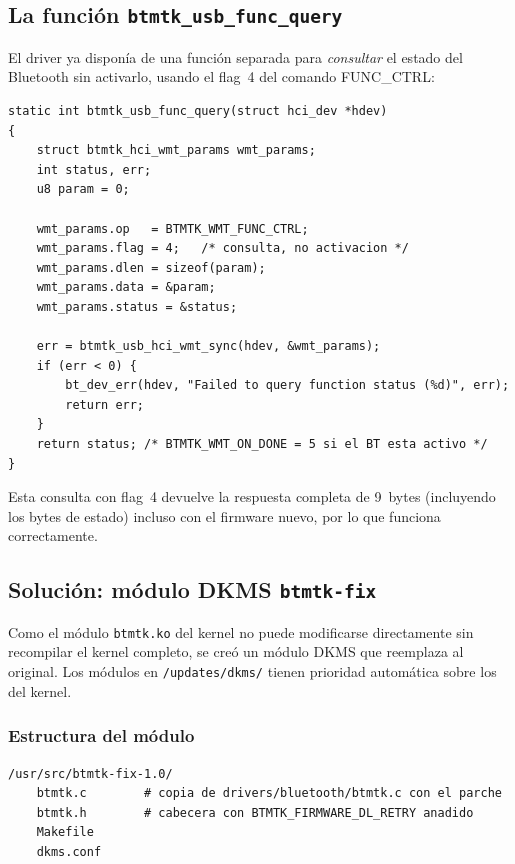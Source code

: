 \documentclass[12pt,a4paper]{article}
\begin{document}
\subsection{La función \texttt{btmtk\_usb\_func\_query}}

El driver ya disponía de una función separada para \emph{consultar} el estado
del Bluetooth sin activarlo, usando el flag~4 del comando FUNC\_CTRL:

\begin{lstlisting}[style=c]
static int btmtk_usb_func_query(struct hci_dev *hdev)
{
    struct btmtk_hci_wmt_params wmt_params;
    int status, err;
    u8 param = 0;

    wmt_params.op   = BTMTK_WMT_FUNC_CTRL;
    wmt_params.flag = 4;   /* consulta, no activacion */
    wmt_params.dlen = sizeof(param);
    wmt_params.data = &param;
    wmt_params.status = &status;

    err = btmtk_usb_hci_wmt_sync(hdev, &wmt_params);
    if (err < 0) {
        bt_dev_err(hdev, "Failed to query function status (%d)", err);
        return err;
    }
    return status; /* BTMTK_WMT_ON_DONE = 5 si el BT esta activo */
}
\end{lstlisting}

Esta consulta con flag~4 devuelve la respuesta completa de 9~bytes
(incluyendo los bytes de estado) incluso con el firmware nuevo, por lo que
funciona correctamente.

\subsection{Solución: módulo DKMS \texttt{btmtk-fix}}

Como el módulo \texttt{btmtk.ko} del kernel no puede modificarse directamente
sin recompilar el kernel completo, se creó un módulo DKMS que reemplaza al
original. Los módulos en \texttt{/updates/dkms/} tienen prioridad automática
sobre los del kernel.

\subsubsection{Estructura del módulo}

\begin{lstlisting}[style=bash]
/usr/src/btmtk-fix-1.0/
    btmtk.c        # copia de drivers/bluetooth/btmtk.c con el parche
    btmtk.h        # cabecera con BTMTK_FIRMWARE_DL_RETRY anadido
    Makefile
    dkms.conf
\end{lstlisting}
\end{document}
